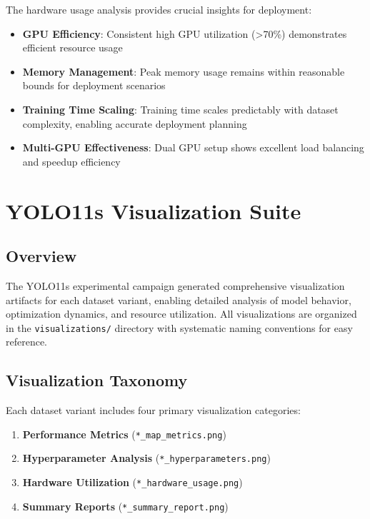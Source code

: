 The hardware usage analysis provides crucial insights for deployment:

\begin{itemize}
    \item \textbf{GPU Efficiency}: Consistent high GPU utilization (>70\%) demonstrates efficient resource usage
    \item \textbf{Memory Management}: Peak memory usage remains within reasonable bounds for deployment scenarios
    \item \textbf{Training Time Scaling}: Training time scales predictably with dataset complexity, enabling accurate deployment planning
    \item \textbf{Multi-GPU Effectiveness}: Dual GPU setup shows excellent load balancing and speedup efficiency
\end{itemize}

\section{YOLO11s Visualization Suite}

\subsection{Overview}

The YOLO11s experimental campaign generated comprehensive visualization artifacts for each dataset variant, enabling detailed analysis of model behavior, optimization dynamics, and resource utilization. All visualizations are organized in the \texttt{visualizations/} directory with systematic naming conventions for easy reference.

\subsection{Visualization Taxonomy}

Each dataset variant includes four primary visualization categories:

\begin{enumerate}
    \item \textbf{Performance Metrics} (\texttt{*\_map\_metrics.png})
    \item \textbf{Hyperparameter Analysis} (\texttt{*\_hyperparameters.png})
    \item \textbf{Hardware Utilization} (\texttt{*\_hardware\_usage.png})
    \item \textbf{Summary Reports} (\texttt{*\_summary\_report.png})
\end{enumerate}

